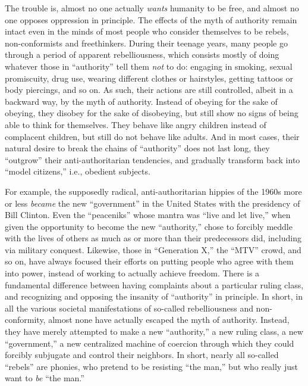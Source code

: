 \documentclass{book}
\begin{document}
The trouble is, almost no one actually \emph{wants} humanity to be free, and almost no one opposes oppression in principle. The effects of the myth of authority remain intact even in the minds of most people who consider themselves to be rebels, non-conformists and freethinkers. During their teenage years, many people go through a period of apparent rebelliousness, which consists mostly of doing whatever those in \enquote{authority} tell them \emph{not} to do: engaging in smoking, sexual promiscuity, drug use, wearing different clothes or hairstyles, getting tattoos or body piercings, and so on. As such, their actions are still controlled, albeit in a backward way, by the myth of authority. Instead of obeying for the sake of obeying, they disobey for the sake of disobeying, but still show no signs of being able to think for themselves. They behave like angry children instead of complacent children, but still do not behave like adults. And in most cases, their natural desire to break the chains of \enquote{authority} does not last long, they \enquote{outgrow} their anti-authoritarian tendencies, and gradually transform back into \enquote{model citizens,} i.e., obedient subjects.

For example, the supposedly radical, anti-authoritarian hippies of the 1960s more or less \emph{became} the new \enquote{government} in the United States with the presidency of Bill Clinton. Even the \enquote{peaceniks} whose mantra was \enquote{live and let live,} when given the opportunity to become the new \enquote{authority,} chose to forcibly meddle with the lives of others as much as or more than their predecessors did, including via military conquest. Likewise, those in \enquote{Generation X,} the \enquote{MTV} crowd, and so on, have always focused their efforts on putting people who agree with them into power, instead of working to actually achieve freedom. There is a fundamental difference between having complaints about a particular ruling class, and recognizing and opposing the insanity of \enquote{authority} in principle. In short, in all the various societal manifestations of so-called rebelliousness and non-conformity, almost none have actually escaped the myth of authority. Instead, they have merely attempted to make a new \enquote{authority,} a new ruling class, a new \enquote{government,} a new centralized machine of coercion through which they could forcibly subjugate and control their neighbors. In short, nearly all so-called \enquote{rebels} are phonies, who pretend to be resisting \enquote{the man,} but who really just want to \emph{be} \enquote{the man.}
\end{document}
